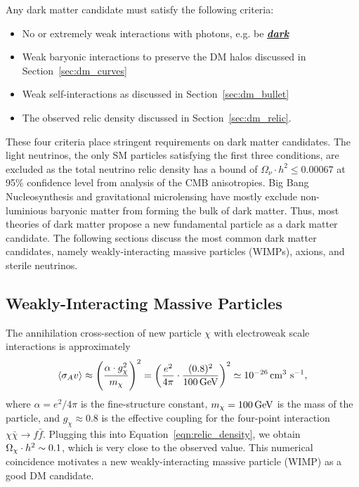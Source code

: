 Any dark matter candidate must satisfy the following criteria:
\begin{itemize}
\item No or extremely weak interactions with photons, e.g. be \underline{\textbf{\textit{dark}}}
\item Weak baryonic interactions to preserve the DM halos discussed in Section~\ref{sec:dm_curves}
\item Weak self-interactions as discussed in Section~\ref{sec:dm_bullet}
\item The observed relic density discussed in Section~\ref{sec:dm_relic}.
\end{itemize}
These four criteria place stringent requirements on dark matter candidates.
The light neutrinos, the only SM particles satisfying the first three conditions, are excluded as the total neutrino relic density has a bound of $\Omega_\nu \cdot h^2 \leq 0.00067$ at 95\% confidence level from analysis of the CMB anisotropies.
Big Bang Nucleosynthesis and gravitational microlensing have mostly exclude non-luminious baryonic matter from forming the bulk of dark matter.
Thus, most theories of dark matter propose a new fundamental particle as a dark matter candidate.
The following sections discuss the most common dark matter candidates, namely weakly-interacting massive particles (WIMPs), axions, and sterile neutrinos.

\subsection{Weakly-Interacting Massive Particles}
\label{sec:dm_wimp}

The annihilation cross-section of new particle $\chi$ with electroweak scale interactions is approximately
\begin{equation}
  \langle \sigma_A v \rangle \approx \left( \frac{\alpha \cdot g_\chi^2}{m_\chi} \right)^2 = \left( \frac{e^2}{4\pi} \cdot \frac{(0.8)^2}{100\,\text{Ge\hspace{-.08em}V}} \right)^2 \simeq 10^{-26} \,\text{cm}^{3}\text{ s}^{-1},
\end{equation}
where $\alpha = e^2 / 4\pi$ is the fine-structure constant, $m_\chi = 100\,\text{Ge\hspace{-.08em}V}$ is the mass of the particle, and $g_\chi \approx 0.8$ is the effective coupling for the four-point interaction $\chi \bar\chi \rightarrow f \bar f$.
Plugging this into Equation~\ref{eqn:relic_density}, we obtain $\Omega_\chi \cdot h^2 \sim 0.1$, which is very close to the observed value.
This numerical coincidence motivates a new weakly-interacting massive particle (WIMP) as a good DM candidate.

